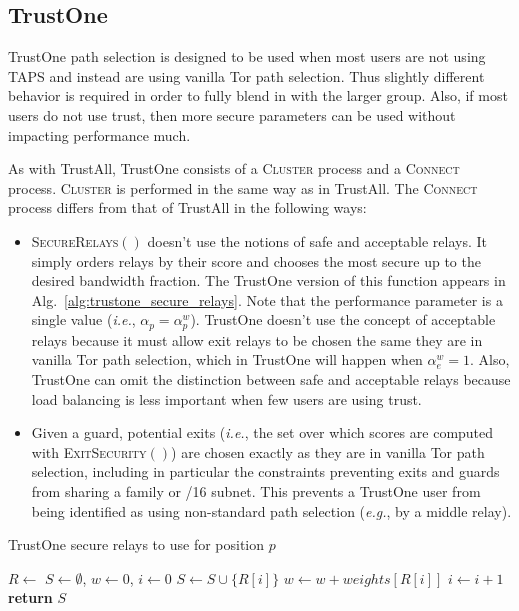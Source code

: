 \documentclass[conference]{styles/IEEEtran}
\newcommand{\eg}{\emph{e.g.}}
\newcommand{\ie}{\emph{i.e.}}
\newcommand{\ps}{TAPS\xspace}
\newcommand{\compactify}{\settowidth{\labelsep}{o} \settowidth{\labelwidth}{o} \settowidth{\labelindent}{o}}
\begin{document}
\subsection{TrustOne}
TrustOne path selection is designed to be used when most users are not using \ps and instead are
using vanilla Tor path selection. Thus slightly different behavior is required in order to fully
blend in with the larger group. Also, if most users do not use trust, then more secure parameters
can be used without impacting performance much.

As with TrustAll, TrustOne consists of a \textsc{Cluster} process and a \textsc{Connect} process.
\textsc{Cluster} is performed in the same way as in TrustAll. The \textsc{Connect} process differs
from that of TrustAll in the following ways:

\begin{itemize}[\compactify]
\item \textsc{SecureRelays}$()$ doesn't use the notions of safe and acceptable relays. It simply
orders relays by their score and chooses the most secure up to the desired bandwidth fraction.
The TrustOne version of this function appears in Alg.~\ref{alg:trustone_secure_relays}. Note that
the performance parameter is a single value (\ie{}, $\alpha_p = \alpha^w_p$). TrustOne
doesn't use the concept of acceptable relays because it must allow exit relays to be chosen the same
they are in vanilla Tor path selection, which in TrustOne will happen when
$\alpha^w_e = 1$. Also, TrustOne can omit the distinction between safe and acceptable relays
because load balancing is less important when few users are using trust.

\item Given a guard, potential exits (\ie{}, the set over which scores are computed with
\textsc{ExitSecurity}$()$)
are chosen exactly as they are in vanilla Tor path selection,
including in particular the constraints preventing exits and guards from sharing a family or /16
subnet. This prevents a TrustOne user from being identified as using non-standard path selection
(\eg{}, by a middle relay).
\end{itemize}

\begin{algorithm}
\caption{TrustOne secure relays to use for position $p$}
\label{alg:trustone_secure_relays}
\begin{algorithmic}[0]
\State $R \gets $ 
\State $S \gets \emptyset$, $w \gets 0$, $i \gets 0$
 
  \State $S \gets S \cup \{R[i]\}$
  \State $w\gets w + weights[R[i]]$
  \State $i \gets i + 1$
\EndWhile
\State \textbf{return} $S$
\EndFunction
\end{algorithmic}
\end{algorithm}
\end{document}
